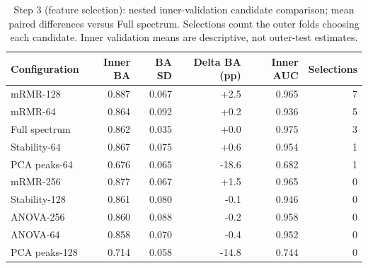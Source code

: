 \begin{table}[t]
\centering
\caption{Step 3 (feature selection): nested inner-validation candidate comparison; mean paired differences versus Full spectrum. Selections count the outer folds choosing each candidate. Inner validation means are descriptive, not outer-test estimates.}
\label{tab:step3_candidates}
\footnotesize
\setlength{\tabcolsep}{4pt}
\begin{tabular}{lrrrrr}
\toprule
Configuration & Inner BA & BA SD & Delta BA (pp) & Inner AUC & Selections \\
\midrule
mRMR-128 & 0.887 & 0.067 & +2.5 & 0.965 & 7 \\
mRMR-64 & 0.864 & 0.092 & +0.2 & 0.936 & 5 \\
Full spectrum & 0.862 & 0.035 & +0.0 & 0.975 & 3 \\
Stability-64 & 0.867 & 0.075 & +0.6 & 0.954 & 1 \\
PCA peaks-64 & 0.676 & 0.065 & -18.6 & 0.682 & 1 \\
mRMR-256 & 0.877 & 0.067 & +1.5 & 0.965 & 0 \\
Stability-128 & 0.861 & 0.080 & -0.1 & 0.946 & 0 \\
ANOVA-256 & 0.860 & 0.088 & -0.2 & 0.958 & 0 \\
ANOVA-64 & 0.858 & 0.070 & -0.4 & 0.952 & 0 \\
PCA peaks-128 & 0.714 & 0.058 & -14.8 & 0.744 & 0 \\
\bottomrule
\end{tabular}
\end{table}
